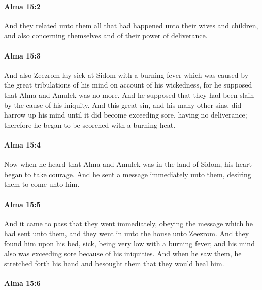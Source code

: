 		\paragraph{Alma 15:2} %
			\label{ALMA-15-2}

			And they related unto them all that had happened unto their wives and children,
			and also concerning themselves and of their power of deliverance.

		\paragraph{Alma 15:3} %
			\label{ALMA-15-3}

			And also Zeezrom lay sick at Sidom with a burning fever
			which was caused by the great tribulations of his mind
			on account of his wickedness,
			for he supposed that Alma and Amulek was no more.
			And he supposed that they had been slain by the cause of his iniquity.
			And this great sin, and his many other sins, did harrow up his mind
			until it did become exceeding sore,
			having no deliverance;
			therefore he began to be scorched with a burning heat.

		\paragraph{Alma 15:4} %
			\label{ALMA-15-4}

			Now when he heard that Alma and Amulek was in the land of Sidom,
			his heart began to take courage.
			And he sent a message immediately unto them,
			desiring them to come unto him.

		\paragraph{Alma 15:5} %
			\label{ALMA-15-5}

			And it came to pass that they went immediately,
			obeying the message which he had sent unto them,
			and they went in unto the house unto Zeezrom.
			And they found him upon his bed, sick,
			being very low with a burning fever;
			and his mind also was exceeding sore because of his iniquities.
			And when he saw them, he stretched forth his hand
			and besought them that they would heal him.

		\paragraph{Alma 15:6} %
			\label{ALMA-15-6}

